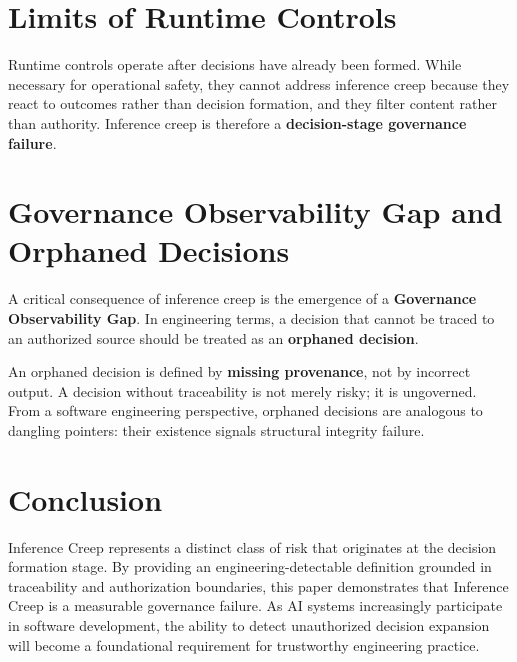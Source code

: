 \documentclass[11pt, a4paper]{article}
\begin{document}
\section{Limits of Runtime Controls}
Runtime controls operate after decisions have already been formed. While necessary for operational safety, they cannot address inference creep because they react to outcomes rather than decision formation, and they filter content rather than authority. Inference creep is therefore a \textbf{decision-stage governance failure}.

\section{Governance Observability Gap and Orphaned Decisions}
A critical consequence of inference creep is the emergence of a \textbf{Governance Observability Gap}. In engineering terms, a decision that cannot be traced to an authorized source should be treated as an \textbf{orphaned decision}.

An orphaned decision is defined by \textbf{missing provenance}, not by incorrect output. A decision without traceability is not merely risky; it is ungoverned. From a software engineering perspective, orphaned decisions are analogous to dangling pointers: their existence signals structural integrity failure.

\section{Conclusion}
Inference Creep represents a distinct class of risk that originates at the decision formation stage. By providing an engineering-detectable definition grounded in traceability and authorization boundaries, this paper demonstrates that Inference Creep is a measurable governance failure. As AI systems increasingly participate in software development, the ability to detect unauthorized decision expansion will become a foundational requirement for trustworthy engineering practice.
\end{document}

